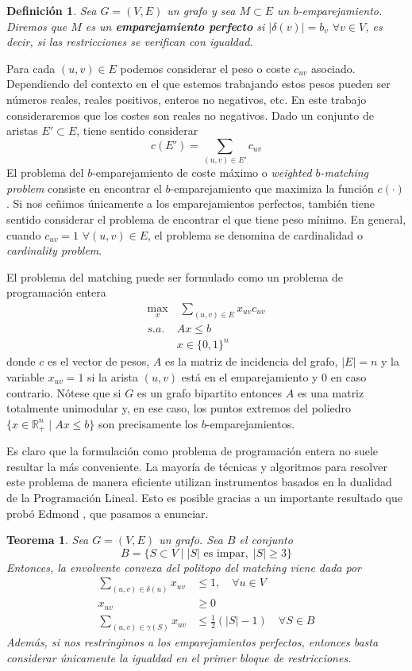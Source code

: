 \documentclass[twoside,a4paper,openright,12pt]{book}
\newtheorem{defi}{Definici\'on}[section]
\newtheorem{thm}{Teorema}[section]
\newcommand{\R}{\mathbb{R}}
\begin{document}
\begin{defi}
Sea $G=(V,E)$ un grafo y sea $M\subset E$ un $b$-emparejamiento. Diremos que $M$ es un \textbf{emparejamiento perfecto} si $|\delta(v)|=b_v$ $\forall v \in V$, es decir, si las restricciones se verifican con igualdad.
\end{defi}
Para cada $(u,v)\in E$ podemos considerar el peso o coste $c_{uv}$ asociado. Dependiendo del contexto en el que estemos trabajando estos pesos pueden ser números reales, reales positivos, enteros no negativos, etc. En este trabajo consideraremos que los costes son reales no negativos. Dado un conjunto de aristas $E'\subset E$, tiene sentido considerar
$$
c(E')=\sum_{(u,v)\in E'} c_{uv}
$$
El problema del $b$-emparejamiento de coste máximo o \textit{weighted $b$-matching problem} consiste en encontrar el $b$-emparejamiento que maximiza la función $c(\cdot)$. Si nos ceñimos únicamente a los emparejamientos perfectos, también tiene sentido considerar el problema de encontrar el que tiene peso mínimo. En general, cuando $c_{uv}=1$ $\forall (u,v)\in E$, el problema se denomina de cardinalidad o \textit{cardinality problem}.

El problema del matching puede ser formulado como un problema de programación entera
\begin{align*}
\max_{x} &\; \sum_{(u,v)\in E} x_{uv}c_{uv}  \nonumber\\ 
s.a.\;  &  Ax\leq b \\
& x\in\{0,1\}^n\nonumber
\end{align*}
donde $c$ es el vector de pesos, $A$ es la matriz de incidencia del grafo, $|E|=n$ y la variable $x_{uv}=1$ si la arista $(u,v)$ está en el emparejamiento y $0$ en caso contrario. Nótese que si $G$ es un grafo bipartito entonces $A$ es una matriz totalmente unimodular y, en ese caso, los puntos extremos del poliedro $\{x \in \R^n_+\mid Ax\leq b\}$ son precisamente los $b$-emparejamientos.

Es claro que la formulación como problema de programación entera no suele resultar la más conveniente. La mayoría de técnicas y algoritmos para resolver este problema de manera eficiente utilizan instrumentos basados en la dualidad de la Programación Lineal. Esto es posible gracias a un importante resultado que probó Edmond \cite{edmond}, que pasamos a enunciar.
\begin{thm}
Sea $G=(V,E)$ un grafo. Sea $B$ el conjunto
$$
B = \{S\subset V \mid |S| \text{ es impar},\;|S|\geq 3\}
$$
Entonces, la envolvente convexa del politopo del matching viene dada por
\begin{align*}
\sum_{(u,v)\in\delta(u)} x_{uv} &\leq 1, \quad \forall u\in V\\
x_{uv} &\geq 0\\
\sum_{(u,v)\in \gamma(S)} x_{uv}& \leq \frac{1}{2}(|S|-1)\quad \forall S \in B	
\end{align*}
Además, si nos restringimos a los emparejamientos perfectos, entonces basta considerar únicamente la igualdad en el primer bloque de restricciones.
\end{thm}
\end{document}
